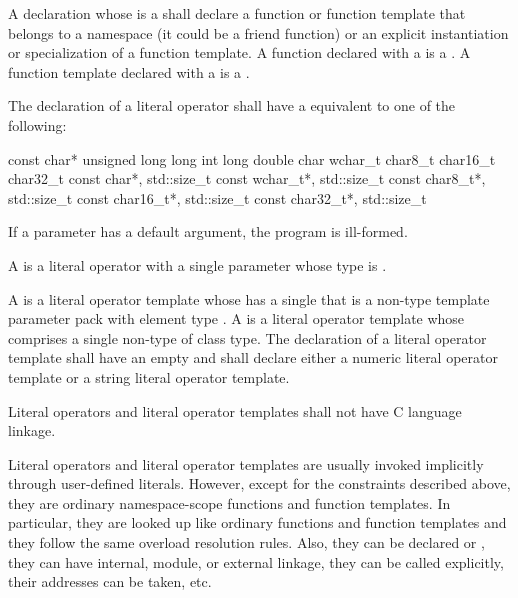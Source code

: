 \pnum
A declaration whose  is a
 shall declare a function or function template
that belongs to a namespace (it could be a friend function) or
an explicit instantiation or specialization of a function template.
A function declared with a  is a . A function template declared with a 
is a .

\pnum
The declaration of a literal operator shall have a
 equivalent to one of the following:

\begin{codeblock}
const char*
unsigned long long int
long double
char
wchar_t
char8_t
char16_t
char32_t
const char*, std::size_t
const wchar_t*, std::size_t
const char8_t*, std::size_t
const char16_t*, std::size_t
const char32_t*, std::size_t
\end{codeblock}

If a parameter has a default argument, the program is
ill-formed.

\pnum
A  is a literal operator with a single parameter
whose type is .

\pnum
A 
is a literal operator template whose 
has a single 
that is a non-type template parameter pack
with element type .
A 
is a literal operator template whose 
comprises
a single non-type  of class type.
The declaration of a literal operator template
shall have an empty 
and shall declare either a numeric literal operator template
or a string literal operator template.

\pnum
Literal operators and literal operator templates shall not have C language linkage.

\pnum
\begin{note}
Literal operators and literal operator templates are usually invoked
implicitly through user-defined literals. However, except for
the constraints described above, they are ordinary namespace-scope functions and
function templates. In particular, they are looked up like ordinary functions
and function templates and they follow the same overload resolution rules. Also,
they can be declared  or ,
they can have internal, module, or external linkage,
they can be called explicitly, their addresses can be
taken, etc.
\end{note}


